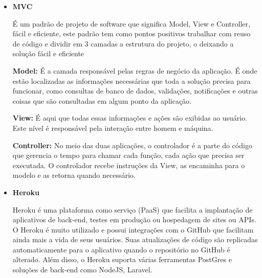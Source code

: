 \begin{itemize}
	\item \textbf{MVC}
	
	É um padrão de projeto de software que significa Model, View e Controller, fácil e eficiente, este padrão tem como pontos positivos trabalhar com reuso de código e dividir em 3 camadas a estrutura do projeto, o deixando a solução fácil e eficiente
	
	\textbf{Model: } %
	É a camada responsável pelas regras de negócio da aplicação. É onde estão localizadas as informações necessárias que toda a solução precisa para funcionar, como consultas de banco de dados, validações, notificações e outras coisas que são consultadas em algum ponto da aplicação.
	
	\textbf{View: } %
	É aqui que todas essas informações e ações são exibidas ao usuário. Este nível é responsável pela interação entre homem e máquina.
	
	\textbf{Controller:} %
	No meio das duas aplicações, o controlador é a parte do código que gerencia o tempo para chamar cada função, cada ação que precisa ser executada. O controlador recebe instruções da View, as encaminha para o modelo e as retorna quando necessário.
	
	
	\item \textbf{Heroku}
	
	Heroku é uma plataforma como serviço (PaaS) que facilita a implantação de aplicativos de back-end, testes em produção ou hospedagem de sites ou APIs. O Heroku é muito utilizado e possui integrações com o GitHub que facilitam ainda mais a vida de seus usuários. Suas atualizações de código são replicadas automaticamente para o aplicativo quando o repositório no GitHub é alterado. Além disso, o Heroku suporta várias ferramentas PostGres e soluções de back-end como NodeJS, Laravel.
	

\end{itemize}
